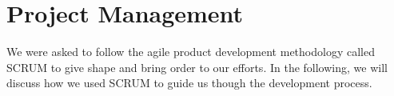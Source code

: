 \chapter{Project Management}\label{chap:project_management_chapter}

We were asked to follow the agile product development methodology called SCRUM to give shape and bring order to our efforts. In the following, we will discuss how we  used SCRUM to guide us though the development process. 









